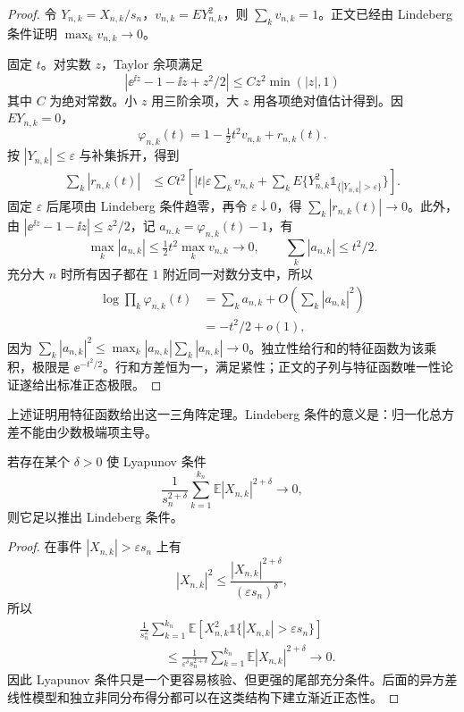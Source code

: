 \begin{proof}
令 $Y_{n,k}=X_{n,k}/s_n$，$v_{n,k}=EY_{n,k}^2$，则 $\sum_kv_{n,k}=1$。正文已经由 Lindeberg 条件证明 $\max_kv_{n,k}\to0$。

固定 $t$。对实数 $z$，Taylor 余项满足
\[
 |\ee^{\ii z}-1-\ii z+z^2/2|\le C z^2\min(|z|,1)
\]
其中 $C$ 为绝对常数。小 $z$ 用三阶余项，大 $z$ 用各项绝对值估计得到。因 $EY_{n,k}=0$，
\[
 \varphi_{n,k}(t)=1-\tfrac12t^2v_{n,k}+r_{n,k}(t).
\]
按 $|Y_{n,k}|\le\varepsilon$ 与补集拆开，得到
\begin{align*}
 \sum_k|r_{n,k}(t)|
 &\le C t^2\left[|t|\varepsilon\sum_kv_{n,k}
 +\sum_kE\{Y_{n,k}^2\mathds{1}_{\{|Y_{n,k}|>\varepsilon\}}\}\right].
\end{align*}
固定 $\varepsilon$ 后尾项由 Lindeberg 条件趋零，再令 $\varepsilon\downarrow0$，得 $\sum_k|r_{n,k}(t)|\to0$。此外，由 $|\ee^{\ii z}-1-\ii z|\le z^2/2$，记 $a_{n,k}=\varphi_{n,k}(t)-1$，有
\[
 \max_k|a_{n,k}|\le\tfrac12t^2\max_kv_{n,k}\to0,
 \qquad \sum_k|a_{n,k}|\le t^2/2.
\]
充分大 $n$ 时所有因子都在 $1$ 附近同一对数分支中，所以
\begin{align*}
 \log\prod_k\varphi_{n,k}(t)
 &=\sum_ka_{n,k}+O\!\left(\sum_k|a_{n,k}|^2\right)\\
 &=-t^2/2+o(1),
\end{align*}
因为 $\sum_k|a_{n,k}|^2\le\max_k|a_{n,k}|\sum_k|a_{n,k}|\to0$。独立性给行和的特征函数为该乘积，极限是 $\ee^{-t^2/2}$。行和方差恒为一，满足紧性；正文的子列与特征函数唯一性论证遂给出标准正态极限。
\end{proof}

上述证明用特征函数给出这一三角阵定理。Lindeberg 条件的意义是：归一化总方差不能由少数极端项主导。\begin{corollary}
若存在某个 $\delta>0$ 使 Lyapunov 条件
\[
 \frac{1}{s_n^{2+\delta}}
 \sum_{k=1}^{k_n}\mathbb E|X_{n,k}|^{2+\delta}\to0,
\]
则它足以推出 Lindeberg 条件。\end{corollary}
\begin{proof}
在事件 $|X_{n,k}|>\varepsilon s_n$ 上有
\[
 |X_{n,k}|^2
 \le
 \frac{|X_{n,k}|^{2+\delta}}
 {(\varepsilon s_n)^\delta},
\]
所以
\begin{align*}
 &\frac1{s_n^2}
 \sum_{k=1}^{k_n}
 \mathbb E\!\left[
 X_{n,k}^2\mathds{1}\{|X_{n,k}|>\varepsilon s_n\}
 \right]\\
 &\qquad\le
 \frac1{\varepsilon^\delta s_n^{2+\delta}}
 \sum_{k=1}^{k_n}\mathbb E|X_{n,k}|^{2+\delta}
 \longrightarrow0.
\end{align*}
因此 Lyapunov 条件只是一个更容易核验、但更强的尾部充分条件。后面的异方差线性模型和独立非同分布得分都可以在这类结构下建立渐近正态性。

\end{proof}

